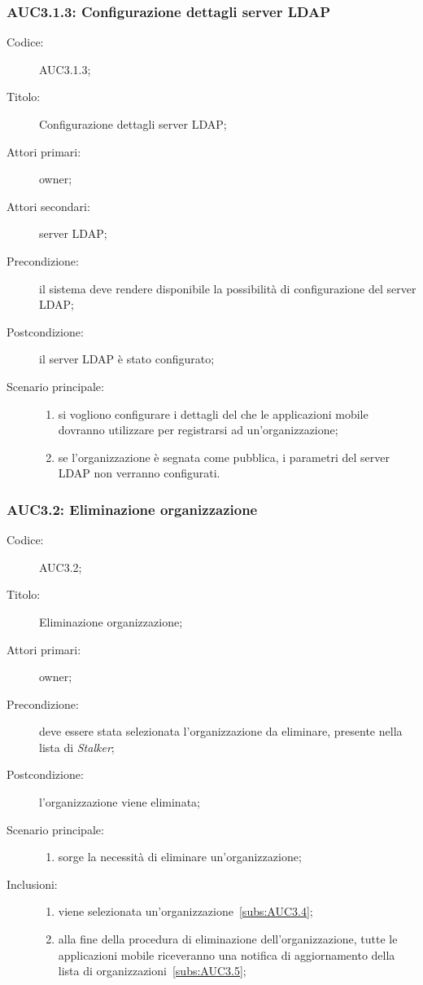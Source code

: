 \documentclass[../../../analisi-dei-requisiti.tex]{subfiles}
\begin{document}
\subsubsection{AUC3.1.3: Configurazione dettagli server LDAP}%
\label{subs:AUC3.1.3}
\begin{description}
  \item[Codice:] AUC3.1.3;
  \item[Titolo:] Configurazione dettagli server LDAP\@;
  \item[Attori primari:] owner;
  \item[Attori secondari:] server LDAP\@;
  \item[Precondizione:] il sistema deve rendere disponibile la possibilità di configurazione del server LDAP\@;
  \item[Postcondizione:] il server LDAP è stato configurato;
  \item[Scenario principale:]
        \begin{enumerate}
          \item si vogliono configurare i dettagli del  che le applicazioni mobile dovranno utilizzare per registrarsi ad un'organizzazione;
          \item se l'organizzazione è segnata come pubblica, i parametri del server LDAP non verranno configurati.
        \end{enumerate}
\end{description}

\subsubsection{AUC3.2: Eliminazione organizzazione}%
\label{subs:AUC3.2}
\begin{description}
  \item[Codice:] AUC3.2;
  \item[Titolo:] Eliminazione organizzazione;
  \item[Attori primari:] owner;
  \item[Precondizione:] deve essere stata selezionata l'organizzazione da eliminare, presente nella lista di \emph{Stalker};
  \item[Postcondizione:] l'organizzazione viene eliminata;
  \item[Scenario principale:]
        \begin{enumerate}
          \item sorge la necessità di eliminare un'organizzazione;
        \end{enumerate}
  \item[Inclusioni:]
        \begin{enumerate}
          \item viene selezionata un'organizzazione~\ref{subs:AUC3.4};
          \item alla fine della procedura di eliminazione dell'organizzazione, tutte le applicazioni mobile riceveranno una notifica di aggiornamento della lista di organizzazioni~\ref{subs:AUC3.5};
        \end{enumerate}
\end{description}
\end{document}
